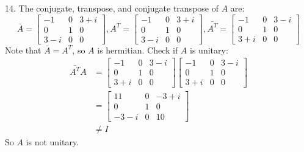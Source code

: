 \documentclass[11pt]{homework}
\begin{document}
14.
The conjugate, transpose, and conjugate transpose of $A$ are:
\begin{equation*}
\bar{A}=
  \begin{bmatrix}
  -1 & 0 &  3+i \\
  0 & 1 & 0 \\
  3-i & 0 & 0
  \end{bmatrix},
A^T=
  \begin{bmatrix}
  -1 & 0 &  3+i \\
  0 & 1 & 0 \\
  3-i & 0 & 0
  \end{bmatrix},
\bar{A^T} =
  \begin{bmatrix}
  -1 & 0 &  3-i \\
  0 & 1 & 0 \\
  3+i & 0 & 0
  \end{bmatrix}
\end{equation*}
Note that $\bar{A}=A^T$, so $A$ is hermitian.
Check if $A$ is unitary:
\begin{align*}
  \bar{A^T}A &= 
  \begin{bmatrix}
  -1 & 0 &  3-i \\
  0 & 1 & 0 \\
  3+i & 0 & 0
  \end{bmatrix}
  \begin{bmatrix}
  -1 & 0 & 3-i \\
  0 & 1 & 0 \\
  3+i & 0 & 0
  \end{bmatrix} \\
  &=
  \begin{bmatrix}
  11 & 0 & -3 +i \\
  0 & 1 & 0 \\
  -3-i & 0 & 10 
  \end{bmatrix} \\
  &\neq I
\end{align*}
So $A$ is not unitary.
\end{document}
